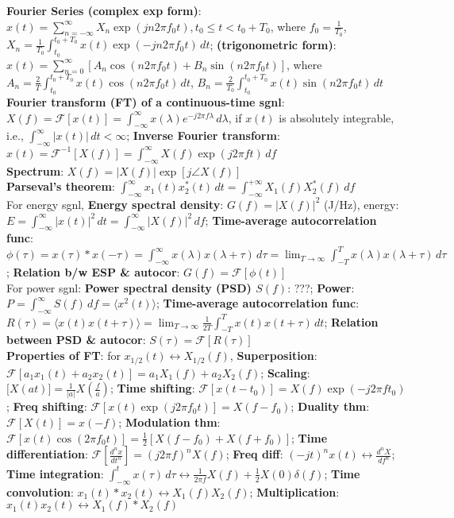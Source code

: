 \documentclass[UTF8,a4paper,10pt]{article}
\providecommand{\abs}[1]{\left\lvert#1\right\rvert}
\begin{document}
\begin{multicols}{2}
    \textbf{Fourier Series (complex exp form)}: $x(t)=\sum_{n=-\infty}^{\infty}X_n\exp(jn2\pi f_0t),t_0\leq t<t_0+T_0$, where $f_0=\frac{1}{T_0}$, $X_n=\frac{1}{T_0}\int_{t_0}^{t_0+T_0}x(t)\exp(-jn2\pi f_0t)\,dt$; \textbf{(trigonometric form)}: $x(t)=\sum_{n=0}^{\infty}[A_n\cos(n2\pi f_0t)+B_n\sin(n2\pi f_0t)]$, where $A_n=\frac{2}{T}\int_{t_0}^{t_0+T_0}x(t)\cos(n2\pi f_0t)\,dt$, $B_n=\frac{2}{T_0}\int_{t_0}^{t_0+T_0}x(t)\sin(n2\pi f_0t)\,dt$\\
    \textbf{Fourier transform (FT) of a continuous-time sgnl}: $X(f)=\mathscr{F}[x(t)]=\int_{-\infty}^{\infty}x(\lambda)e^{-j2\pi f\lambda}\,d\lambda$, if $x(t)$ is absolutely integrable, i.e., $\int_{-\infty}^{\infty}\abs{x(t)}\,dt<\infty$; \textbf{Inverse Fourier transform}: $x(t)=\mathscr{F}^{-1}[X(f)]=\int_{-\infty}^{\infty}X(f)\exp(j2\pi ft)\,df$\\
    \textbf{Spectrum}: $X(f)=\abs{X(f)}\exp[j\angle X(f)]$\\
    \textbf{Parseval's theorem}: $\int_{-\infty}^{\infty}x_1(t)x_2^*(t)\,dt=\int_{-\infty}^{+\infty}X_1(f)X_2^*(f)\,df$\\
    For energy sgnl, \textbf{Energy spectral density}: $G(f)=\abs{X(f)}^2$ (J/Hz), energy: $E=\int_{-\infty}^{\infty}\abs{x(t)}^2\,dt=\int_{-\infty}^{\infty}\abs{X(f)}^2\,df$; \textbf{Time-average autocorrelation func}: $\phi(\tau)=x(\tau)*x(-\tau)=\int_{-\infty}^{\infty}x(\lambda)x(\lambda+\tau)\,d\tau=\lim_{T\rightarrow\infty}\int_{-T}^Tx(\lambda)x(\lambda+\tau)\,d\tau$; \textbf{Relation b/w ESP \& autocor}: $G(f)=\mathscr{F}[\phi(t)]$\\
    For power sgnl: \textbf{Power spectral density (PSD) $S(f)$}: ???; \textbf{Power}: $P=\int_{-\infty}^{\infty}S(f)\,df=\langle x^2(t)\rangle$; \textbf{Time-average autocorrelation func}: $R(\tau)=\langle x(t)x(t+\tau)\rangle=\lim_{T\rightarrow\infty}\frac{1}{2T}\int_{-T}^Tx(t)x(t+\tau)\,dt$; \textbf{Relation between PSD \& autocor}: $S(\tau)=\mathscr{F}[R(\tau)]$\\
    \textbf{Properties of FT}: for $x_{1/2}(t)\leftrightarrow X_{1/2}(f)$, \textbf{Superposition}: $\mathscr{F}[a_1x_1(t)+a_2x_2(t)]=a_1X_1(f)+a_2X_2(f)$; \textbf{Scaling}: $\mathscr[X(at)]=\frac{1}{\abs{a}}X(\frac{f}{a})$; \textbf{Time shifting}: $\mathscr{F}[x(t-t_0)]=X(f)\exp(-j2\pi ft_0)$; \textbf{Freq shifting}: $\mathscr{F}[x(t)\exp(j2\pi f_0t)]=X(f-f_0)$; \textbf{Duality thm}: $\mathscr{F}[X(t)]=x(-f)$; \textbf{Modulation thm}: $\mathscr{F}[x(t)\cos(2\pi f_0t)]=\frac{1}{2}[X(f-f_0)+X(f+f_0)]$; \textbf{Time differentiation}: $\mathscr{F}[\frac{d^nx}{dt^n}]=(j2\pi f)^nX(f)$; \textbf{Freq diff}: $(-jt)^nx(t)\leftrightarrow\frac{d^nX}{df^n}$; \textbf{Time integration}: $\int_{-\infty}^tx(\tau)\,d\tau\leftrightarrow\frac{1}{2\pi f}X(f)+\frac{1}{2}X(0)\delta(f)$; \textbf{Time convolution}: $x_1(t)*x_2(t)\leftrightarrow X_1(f)X_2(f)$; \textbf{Multiplication}: $x_1(t)x_2(t)\leftrightarrow X_1(f)*X_2(f)$\\

\end{multicols}
\end{document}
